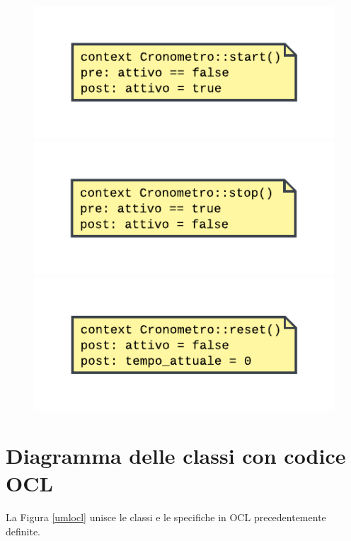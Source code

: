 \documentclass[11pt, a4paper]{article}
\theoremstyle{definition} %
\begin{document}
\begin{itemize}
    \begin{figure}[H]
    \includegraphics[scale = 0.9]{materiale/ocl-start.pdf}
    \includegraphics[scale = 0.9]{materiale/ocl-stop.pdf}
    \centering
    \includegraphics[scale = 0.9]{materiale/ocl-reset.pdf}
    \end{figure}
\end{itemize}









\newpage
\section{Diagramma delle classi con codice OCL}
La Figura \ref{umlocl} unisce le classi e le specifiche in OCL precedentemente definite.
\end{document}
